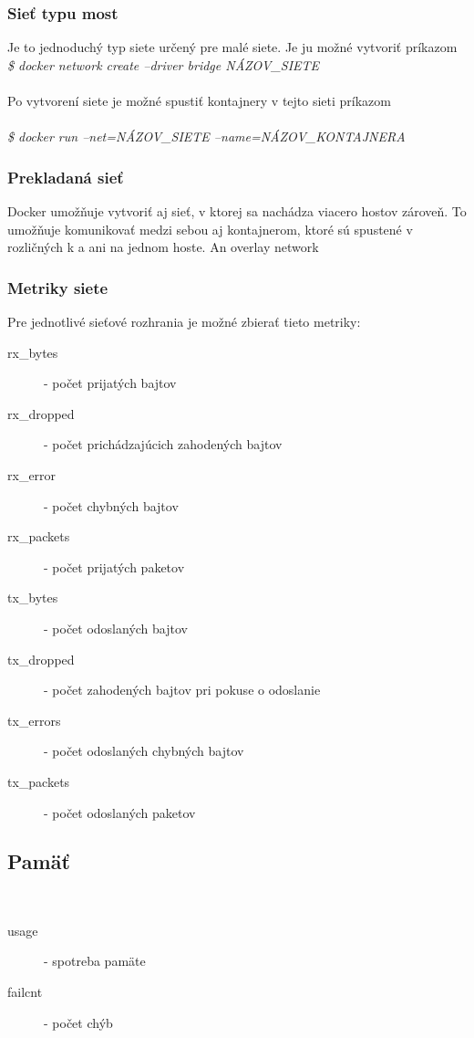 \documentclass[11pt,final,oneside]{fithesis}
\begin{document}
\subsubsection{Sieť typu most}
Je to jednoduchý typ siete určený pre malé siete. Je ju možné vytvoriť príkazom 
\\
{\em \$ docker network create --driver bridge NÁZOV\_SIETE}
\\ \\
Po vytvorení siete je možné spustiť kontajnery v tejto sieti príkazom
\\ \\
{\em \$ docker run --net=NÁZOV\_SIETE --name=NÁZOV\_KONTAJNERA}

\subsubsection{Prekladaná sieť}
Docker umožňuje vytvoriť aj sieť, v ktorej sa nachádza viacero hostov zároveň. To umožňuje komunikovať medzi sebou aj kontajnerom,
ktoré sú spustené v rozličných k a ani na jednom hoste.
An overlay network

\subsubsection{Metriky siete}
Pre jednotlivé sieťové rozhrania je možné zbierať tieto metriky:
\begin{description}
\item[rx_bytes] - počet prijatých bajtov
\item[rx_dropped] - počet prichádzajúcich zahodených bajtov
\item[rx_error] - počet chybných bajtov
\item[rx_packets] - počet prijatých paketov
\item[tx_bytes] - počet odoslaných bajtov
\item[tx_dropped] - počet zahodených bajtov pri pokuse o odoslanie
\item[tx_errors] - počet odoslaných chybných bajtov
\item[tx_packets] - počet odoslaných paketov
\end{description}

\subsection{Pamäť}
\\
\begin{description}
\item[usage] - spotreba pamäte
\item[failcnt] - počet chýb
\end{description}
\end{document}
